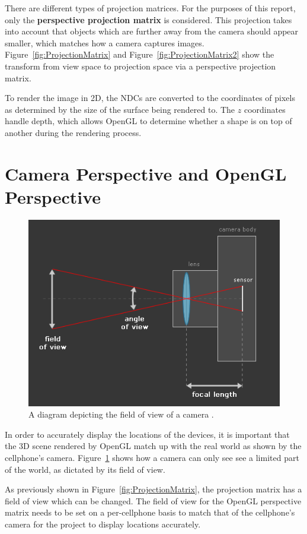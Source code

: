 There are different types of projection matrices. For the purposes of this report, only the \textbf{perspective projection matrix} is considered. This projection takes into account that objects which are further away from the camera should appear smaller, which matches how a camera captures images. Figure~\ref{fig:ProjectionMatrix} and Figure~\ref{fig:ProjectionMatrix2} show the transform from view space to projection space via a perspective projection matrix.

To render the image in 2D, the NDCs are converted to the coordinates of pixels as determined by the size of the surface being rendered to. The $z$ coordinates handle depth, which allows OpenGL to determine whether a shape is on top of another during the rendering process.

\section{Camera Perspective and OpenGL Perspective}
\begin{figure}
	\centering
	\includegraphics[width=\linewidth]{Figures/CameraLens.png}
	\decoRule
	\caption{A diagram depicting the field of view of a camera \cite{MartyBugs}.}
	\label{fig:CameraLens}
\end{figure}
In order to accurately display the locations of the devices, it is important that the 3D scene rendered by OpenGL match up with the real world as shown by the cellphone's camera. Figure~\ref{fig:CameraLens} shows how a camera can only see see a limited part of the world, as dictated by its field of view.

As previously shown in Figure~\ref{fig:ProjectionMatrix}, the projection matrix has a field of view which can be changed. The field of view for the OpenGL perspective matrix needs to be set on a per-cellphone basis to match that of the cellphone's camera for the project to display locations accurately.

